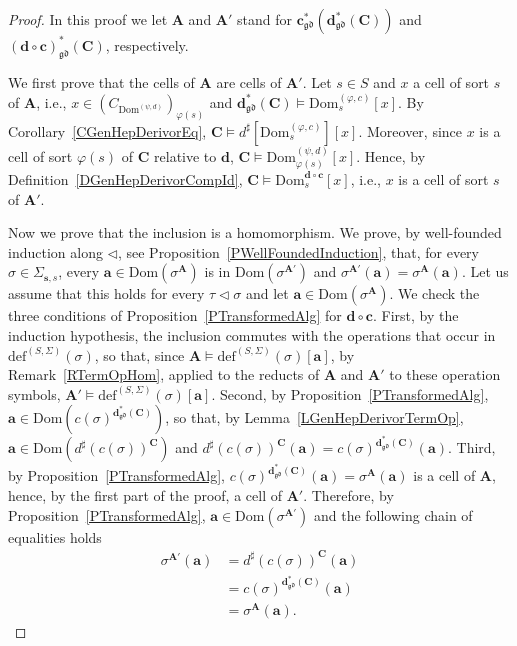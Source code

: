 \documentclass[a4paper, reqno]{amsbook}
\newcommand{\Dom}{\mathrm{Dom}}
\newcommand{\gd}{\mathfrak{gd}}              %
\theoremstyle{plain}
\theoremstyle{definition}
\begin{document}
\begin{proof}
In this proof we let $\mathbf{A}$ and $\mathbf{A}'$ stand for $\mathbf{c}^{\ast}_{\gd}(\mathbf{d}^{\ast}_{\gd}(\mathbf{C}))$ and $(\mathbf{d}\circ\mathbf{c})^{\ast}_{\gd}(\mathbf{C})$, respectively.

We first prove that the cells of $\mathbf{A}$ are cells of $\mathbf{A}'$.
Let $s\in S$ and $x$ a cell of sort $s$ of $\mathbf{A}$, i.e., $x\in(C_{\Dom^{(\psi,d)}})_{\varphi(s)}$ and $\mathbf{d}^{\ast}_{\gd}(\mathbf{C})\models\Dom^{(\varphi,c)}_{s}[x]$.
By Corollary~\ref{CGenHepDerivorEq}, $\mathbf{C}\models d^{\sharp}[\Dom^{(\varphi,c)}_{s}][x]$.
Moreover, since $x$ is a cell of sort $\varphi(s)$ of $\mathbf{C}$ relative to $\mathbf{d}$, $\mathbf{C}\models\Dom^{(\psi,d)}_{\varphi(s)}[x]$.
Hence, by Definition~\ref{DGenHepDerivorCompId}, $\mathbf{C}\models\Dom^{\mathbf{d}\circ\mathbf{c}}_{s}[x]$, i.e., $x$ is a cell of sort $s$ of $\mathbf{A}'$.

Now we prove that the inclusion is a homomorphism.
We prove, by well-founded induction along $\lhd$, see Proposition~\ref{PWellFoundedInduction}, that, for every $\sigma\in\Sigma_{\mathbf{s},s}$, every $\mathbf{a}\in\Dom(\sigma^{\mathbf{A}})$ is in $\Dom(\sigma^{\mathbf{A}'})$ and $\sigma^{\mathbf{A}'}(\mathbf{a})=\sigma^{\mathbf{A}}(\mathbf{a})$.
Let us assume that this holds for every $\tau\lhd\sigma$ and let $\mathbf{a}\in\Dom(\sigma^{\mathbf{A}})$.
We check the three conditions of Proposition~\ref{PTransformedAlg} for $\mathbf{d}\circ\mathbf{c}$.
First, by the induction hypothesis, the inclusion commutes with the operations that occur in $\mathrm{def}^{(S,\Sigma)}(\sigma)$, so that, since $\mathbf{A}\models\mathrm{def}^{(S,\Sigma)}(\sigma)[\mathbf{a}]$, by Remark~\ref{RTermOpHom}, applied to the reducts of $\mathbf{A}$ and $\mathbf{A}'$ to these operation symbols, $\mathbf{A}'\models\mathrm{def}^{(S,\Sigma)}(\sigma)[\mathbf{a}]$.
Second, by Proposition~\ref{PTransformedAlg}, $\mathbf{a}\in\Dom(c(\sigma)^{\mathbf{d}^{\ast}_{\gd}(\mathbf{C})})$, so that, by Lemma~\ref{LGenHepDerivorTermOp}, $\mathbf{a}\in\Dom(d^{\sharp}(c(\sigma))^{\mathbf{C}})$ and $d^{\sharp}(c(\sigma))^{\mathbf{C}}(\mathbf{a})=c(\sigma)^{\mathbf{d}^{\ast}_{\gd}(\mathbf{C})}(\mathbf{a})$.
Third, by Proposition~\ref{PTransformedAlg}, $c(\sigma)^{\mathbf{d}^{\ast}_{\gd}(\mathbf{C})}(\mathbf{a})=\sigma^{\mathbf{A}}(\mathbf{a})$ is a cell of $\mathbf{A}$, hence, by the first part of the proof, a cell of $\mathbf{A}'$.
Therefore, by Proposition~\ref{PTransformedAlg}, $\mathbf{a}\in\Dom(\sigma^{\mathbf{A}'})$ and the following chain of equalities holds
\begin{align*}
\sigma^{\mathbf{A}'}\left(\mathbf{a}\right)
&=
d^{\sharp}(c(\sigma))^{\mathbf{C}}\left(\mathbf{a}\right)
\tag{1}
\\&=
c(\sigma)^{\mathbf{d}^{\ast}_{\gd}(\mathbf{C})}\left(\mathbf{a}\right)
\tag{2}
\\&=
\sigma^{\mathbf{A}}\left(\mathbf{a}\right).
\tag{3}
\end{align*}


\end{proof}
\end{document}
